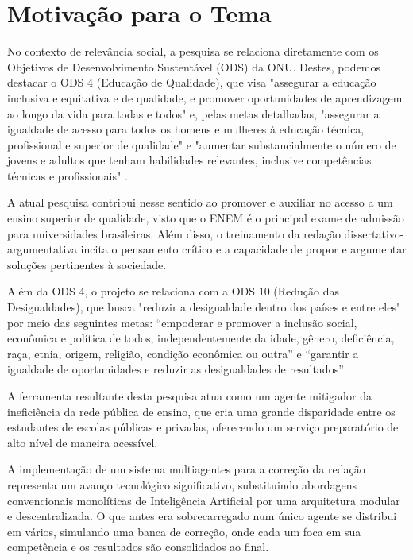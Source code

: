 \documentclass[12pt]{article}
\begin{document}
\section{Motivação para o Tema}
\label{sec:motivacao}

No contexto de relevância social, a pesquisa se relaciona diretamente com os Objetivos de Desenvolvimento Sustentável (ODS) da ONU. Destes, podemos destacar o ODS 4 (Educação de Qualidade), que visa "assegurar a educação inclusiva e equitativa e de qualidade, e promover oportunidades de aprendizagem ao longo da vida para todas e todos" e, pelas metas detalhadas, "assegurar a igualdade de acesso para todos os homens e mulheres à educação técnica, profissional e superior de qualidade" e "aumentar substancialmente o número de jovens e adultos que tenham habilidades relevantes, inclusive competências técnicas e profissionais" \cite{odsONU}.

A atual pesquisa contribui nesse sentido ao promover e auxiliar no acesso a um ensino superior de qualidade, visto que o ENEM é o principal exame de admissão para universidades brasileiras. Além disso, o treinamento da redação dissertativo-argumentativa incita o pensamento crítico e a capacidade de propor e argumentar soluções pertinentes à sociedade.

Além da ODS 4, o projeto se relaciona com a ODS 10 (Redução das Desigualdades), que busca "reduzir a desigualdade dentro dos países e entre eles" por meio das seguintes metas: “empoderar e promover a inclusão social, econômica e política de todos, independentemente da idade, gênero, deficiência, raça, etnia, origem, religião, condição econômica ou outra” e “garantir a igualdade de oportunidades e reduzir as desigualdades de resultados” \cite{odsONU}.

A ferramenta resultante desta pesquisa atua como um agente mitigador da ineficiência da rede pública de ensino, que cria uma grande disparidade entre os estudantes de escolas públicas e privadas, oferecendo um serviço preparatório de alto nível de maneira acessível.

A implementação de um sistema multiagentes para a correção da redação representa um avanço tecnológico significativo, substituindo abordagens convencionais monolíticas de Inteligência Artificial por uma arquitetura modular e descentralizada. O que antes era sobrecarregado num único agente se distribui em vários, simulando uma banca de correção, onde cada um foca em sua competência e os resultados são consolidados ao final.
\end{document}
